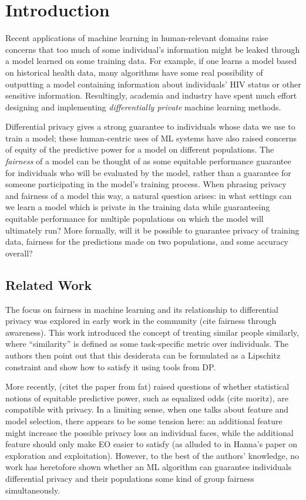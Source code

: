 
\section{Introduction}
Recent applications of machine learning in human-relevant domains
raise concerns that too much of some individual's information might be
leaked through a model learned on some training data. For example, if
one learns a model based on historical health data, many algorithms
have some real possibility of outputting a model containing
information about individuals' HIV status or other sensitive
information.  Resultingly, academia and industry have spent much
effort designing and implementing \emph{differentially private}
machine learning methods.

Differential privacy gives a strong guarantee to individuals whose
data we use to train a model; these human-centric uses of ML systems
have also raised concerns of equity of the predictive power for a
model on different populations. The \emph{fairness} of a model can be
thought of as some equitable performance guarantee for individuals who
will be evaluated by the model, rather than a guarantee for someone
participating in the model's training process. When phrasing privacy
and fairness of a model this way, a natural question arises: in what
settings can we learn a model which is private in the training data
while guaranteeing equitable performance for multiple populations on
which the model will ultimately run? More formally, will it be
possible to guarantee privacy of training data, fairness for the
predictions made on two populations, and some accuracy overall?


\subsection{Related Work}

The focus on fairness in machine learning and its relationship to
differential privacy was explored in early work in the community (cite
fairness through awareness). This work introduced the concept of
treating similar people similarly, where ``similarity'' is defined as
some task-specific metric over individuals.  The authors then point
out that this desiderata can be formulated as a Lipschitz constraint
and show how to satisfy it using tools from DP.

More recently, (citet the paper from fat) raised questions of whether
statistical notions of equitable predictive power, such as equalized
odds (cite moritz), are compatible with privacy. In a limiting sense,
when one talks about feature and model selection, there appears to be
some tension here: an additional feature might increase the possible
privacy loss an individual faces, while the additional feature should
only make EO easier to satisfy (as alluded to in Hanna's paper on
exploration and exploitation). However, to the best of the authors'
knowledge, no work has heretofore shown whether an ML algorithm can
guarantee individuals differential privacy and their populations some
kind of group fairness simultaneously.

